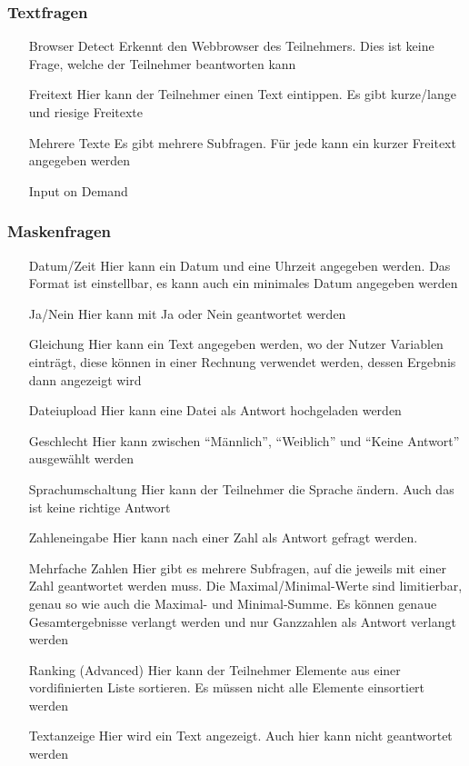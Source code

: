 \subsubsection{Textfragen}

\begin{itemize}
	\item[Browser Detect] Erkennt den Webbrowser des Teilnehmers. Dies ist keine Frage, welche der Teilnehmer beantworten kann
	\item[Freitext] Hier kann der Teilnehmer einen Text eintippen. Es gibt kurze/lange und riesige Freitexte
	\item[Mehrere Texte] Es gibt mehrere Subfragen. Für jede kann ein kurzer Freitext angegeben werden
	\item[Input on Demand] %
\end{itemize}

\subsubsection{Maskenfragen}

\begin{itemize}
	\item[Datum/Zeit] Hier kann ein Datum und eine Uhrzeit angegeben werden. Das Format ist einstellbar, es kann auch ein minimales Datum angegeben werden
	\item[Ja/Nein] Hier kann mit Ja oder Nein geantwortet werden
	\item[Gleichung] Hier kann ein Text angegeben werden, wo der Nutzer Variablen einträgt, diese können in einer Rechnung verwendet werden, dessen Ergebnis dann angezeigt wird
	\item[Dateiupload] Hier kann eine Datei als Antwort hochgeladen werden
	\item[Geschlecht] Hier kann zwischen \enquote{Männlich}, \enquote{Weiblich} und \enquote{Keine Antwort} ausgewählt werden
	\item[Sprachumschaltung] Hier kann der Teilnehmer die Sprache ändern. Auch das ist keine richtige Antwort
	\item[Zahleneingabe] Hier kann nach einer Zahl als Antwort gefragt werden.
	\item[Mehrfache Zahlen] Hier gibt es mehrere Subfragen, auf die jeweils mit einer Zahl geantwortet werden muss. Die Maximal/Minimal-Werte sind limitierbar, genau so wie auch die Maximal- und Minimal-Summe. Es können genaue Gesamtergebnisse verlangt werden und nur Ganzzahlen als Antwort verlangt werden
	\item[Ranking (Advanced)] Hier kann der Teilnehmer Elemente aus einer vordifinierten Liste sortieren. Es müssen nicht alle Elemente einsortiert werden
	\item[Textanzeige] Hier wird ein Text angezeigt. Auch hier kann nicht geantwortet werden
\end{itemize}

